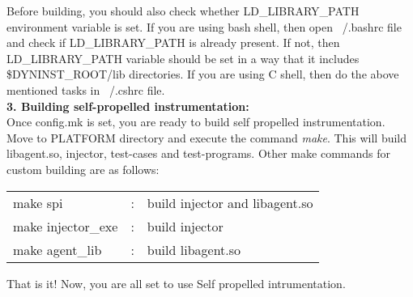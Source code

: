 Before building, you should also check whether LD\_LIBRARY\_PATH environment variable is set. If you are using bash shell, then open ~/.bashrc file and check if LD\_LIBRARY\_PATH is already present. If not, then LD\_LIBRARY\_PATH variable should be set in a way that it includes {\$DYNINST\_ROOT}/lib directories.  If you are using C shell, then do the above mentioned tasks in ~/.cshrc file. \\
 
\textbf{3. Building self-propelled instrumentation:} \\
Once config.mk is set, you are ready to build self propelled instrumentation. Move to PLATFORM directory  and execute the command \textit{make}. This will build libagent.so, injector, test-cases and  test-programs. Other make commands for custom building are as follows:

\begin{table}[h]
\begin{tabular}{l c l}
make spi&:& build injector and libagent.so \\
make injector\_exe&:& build injector \\
make agent\_lib&: &build libagent.so  \\
\end{tabular}
\end{table}

That is it! Now, you are all set to use Self propelled intrumentation.

